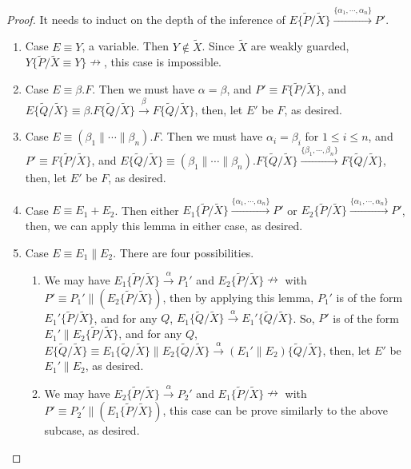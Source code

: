 \begin{proof}
It needs to induct on the depth of the inference of $E\{\widetilde{P}/\widetilde{X}\}\xrightarrow{\{\alpha_1,\cdots,\alpha_n\}}P'$.

\begin{enumerate}
  \item Case $E\equiv Y$, a variable. Then $Y\notin \widetilde{X}$. Since $\widetilde{X}$ are weakly guarded, $Y\{\widetilde{P}/\widetilde{X}\equiv Y\}\nrightarrow$, this case is impossible.
  \item Case $E\equiv\beta.F$. Then we must have $\alpha=\beta$, and $P'\equiv F\{\widetilde{P}/\widetilde{X}\}$, and $E\{\widetilde{Q}/\widetilde{X}\}\equiv \beta.F\{\widetilde{Q}/\widetilde{X}\} \xrightarrow{\beta}F\{\widetilde{Q}/\widetilde{X}\}$, then, let $E'$ be $F$, as desired.
  \item Case $E\equiv(\beta_1\parallel\cdots\parallel\beta_n).F$. Then we must have $\alpha_i=\beta_i$ for $1\leq i\leq n$, and $P'\equiv F\{\widetilde{P}/\widetilde{X}\}$, and $E\{\widetilde{Q}/\widetilde{X}\}\equiv (\beta_1\parallel\cdots\parallel\beta_n).F\{\widetilde{Q}/\widetilde{X}\} \xrightarrow{\{\beta_1,\cdots,\beta_n\}}F\{\widetilde{Q}/\widetilde{X}\}$, then, let $E'$ be $F$, as desired.
  \item Case $E\equiv E_1+E_2$. Then either $E_1\{\widetilde{P}/\widetilde{X}\} \xrightarrow{\{\alpha_1,\cdots,\alpha_n\}}P'$ or $E_2\{\widetilde{P}/\widetilde{X}\} \xrightarrow{\{\alpha_1,\cdots,\alpha_n\}}P'$, then, we can apply this lemma in either case, as desired.
  \item Case $E\equiv E_1\parallel E_2$. There are four possibilities.
  \begin{enumerate}
    \item We may have $E_1\{\widetilde{P}/\widetilde{X}\} \xrightarrow{\alpha}P_1'$ and $E_2\{\widetilde{P}/\widetilde{X}\}\nrightarrow$ with $P'\equiv P_1'\parallel (E_2\{\widetilde{P}/\widetilde{X}\})$, then by applying this lemma, $P_1'$ is of the form $E_1'\{\widetilde{P}/\widetilde{X}\}$, and for any $Q$, $E_1\{\widetilde{Q}/\widetilde{X}\}\xrightarrow{\alpha} E_1'\{\widetilde{Q}/\widetilde{X}\}$. So, $P'$ is of the form $E_1'\parallel E_2\{\widetilde{P}/\widetilde{X}\}$, and for any $Q$, $E\{\widetilde{Q}/\widetilde{X}\}\equiv E_1\{\widetilde{Q}/\widetilde{X}\}\parallel E_2\{\widetilde{Q}/\widetilde{X}\}\xrightarrow{\alpha} (E_1'\parallel E_2)\{\widetilde{Q}/\widetilde{X}\}$, then, let $E'$ be $E_1'\parallel E_2$, as desired.
    \item We may have $E_2\{\widetilde{P}/\widetilde{X}\} \xrightarrow{\alpha}P_2'$ and $E_1\{\widetilde{P}/\widetilde{X}\}\nrightarrow$ with $P'\equiv P_2'\parallel (E_1\{\widetilde{P}/\widetilde{X}\})$, this case can be prove similarly to the above subcase, as desired.

\end{enumerate}
\end{enumerate}
\end{proof}
